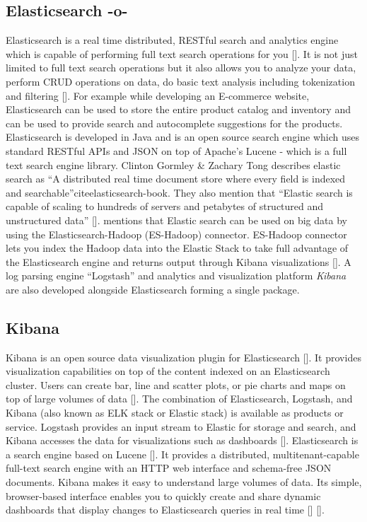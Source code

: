   
\subsection{Elasticsearch -o-}

Elasticsearch is a real time distributed, RESTful search and analytics
engine which is capable of performing full text search operations for
you [\cite{www-elasticsearch}].  It is not just limited to full text
search operations but it also allows you to analyze your data, perform
CRUD operations on data, do basic text analysis including tokenization
and filtering [\cite{www-elasticsearch-intro}]. For example while
developing an E-commerce website, Elasticsearch can be used to store
the entire product catalog and inventory and can be used to provide
search and autocomplete suggestions for the products. Elasticsearch is
developed in Java and is an open source search engine which uses
standard RESTful APIs and JSON on top of Apache's Lucene - which is a
full text search engine library. Clinton Gormley \& Zachary Tong
describes elastic search as ``A distributed real time document store
where every field is indexed and
searchable''cite{elasticsearch-book}. They also mention that ``Elastic
search is capable of scaling to hundreds of servers and petabytes of
structured and unstructured data''
[\cite{www-elasticsearch-hadoop}]. mentions that Elastic search can be
used on big data by using the Elasticsearch-Hadoop (ES-Hadoop)
connector. ES-Hadoop connector lets you index the Hadoop data into the
Elastic Stack to take full advantage of the Elasticsearch engine and
returns output through Kibana visualizations
[\cite{www-wikipedia-elasticsearch}]. A log parsing engine
``Logstash'' and analytics and visualization platform \textit{Kibana}
are also developed alongside Elasticsearch forming a single package.


    
\subsection{Kibana}

Kibana is an open source data visualization plugin for
Elasticsearch [\cite{www-kibana-1}]. It provides visualization
capabilities on top of the content indexed on an Elasticsearch
cluster. Users can create bar, line and scatter plots, or pie charts
and maps on top of large volumes of data [\cite{www-kibana-2}]. The
combination of Elasticsearch, Logstash, and Kibana (also known as ELK
stack or Elastic stack) is available as products or service. Logstash
provides an input stream to Elastic for storage and search, and Kibana
accesses the data for visualizations such as
dashboards [\cite{www-kibana-3}].  Elasticsearch is a search engine
based on Lucene [\cite{www-kibana-4}]. It provides a distributed,
multitenant-capable full-text search engine with an HTTP web interface
and schema-free JSON documents. Kibana makes it easy to understand
large volumes of data. Its simple, browser-based interface enables you
to quickly create and share dynamic dashboards that display changes to
Elasticsearch queries in real
time [\cite{www-kibana-5}] [\cite{www-kibana-6}].

